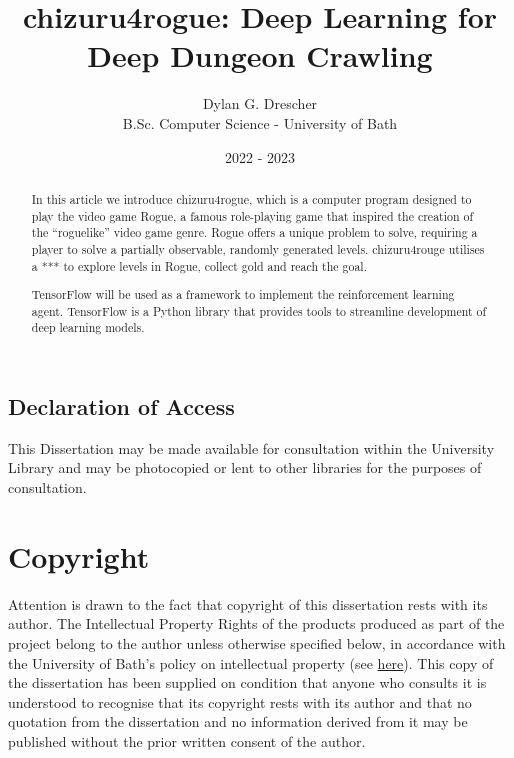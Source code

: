 \documentclass[11pt,a4paper]{article}
\begin{document}
    \title{chizuru4rogue: Deep Learning for Deep Dungeon Crawling}
    \author{Dylan G. Drescher \\[1ex] B.Sc. Computer Science - University of Bath}
    \date{2022 - 2023}
    \maketitle

    \begin{abstract}
        In this article we introduce chizuru4rogue, which is a computer program designed to play the video game Rogue, a famous role-playing game that inspired the creation of the ``roguelike'' video game genre. Rogue offers a unique problem to solve, requiring a player to solve a partially observable, randomly generated levels. chizuru4rouge utilises a *** to explore levels in Rogue, collect gold and reach the goal.

        TensorFlow will be used as a framework to implement the reinforcement learning agent. TensorFlow is a Python library that provides tools to streamline development of deep learning models.
    \end{abstract}

    \setcounter{page}{0}
    \thispagestyle{empty}

    \newpage

    \begin{center}
        \section*{Declaration of Access}

        This Dissertation may be made available for consultation within the University Library and may be photocopied or lent to other libraries for the purposes of consultation.
    \end{center}

    \newpage

    \section*{Copyright}
    Attention is drawn to the fact that copyright of this dissertation rests with its author. The Intellectual Property Rights of the products produced as part of the project belong to the author unless otherwise specified below, in accordance with the University of Bath's policy on intellectual property (see \href{https://www.bath.ac.uk/publications/university-ordinances/attachments/Ordinances_1_October_2020.pdf}{here}). This copy of the dissertation has been supplied on condition that anyone who consults it is understood to recognise that its copyright rests with its author and that no quotation from the dissertation and no information derived from it may be published without the prior written consent of the author.
\end{document}

